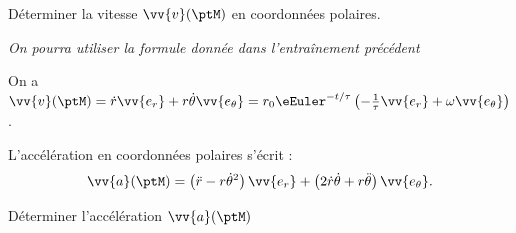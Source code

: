 \debutEntrainement






\begin{enonce}
	Déterminer la vitesse $\vv{v}(\ptM)$ en coordonnées polaires. \minusMedskip
	
	{\itshape On pourra utiliser la formule donnée dans l'entraînement précédent}
\end{enonce}


\begin{corrige}
	On a $ \vv{v}(\ptM)=\dot{r} \vv{e_r}+ r\dot{\theta}\vv{e_\theta}=r_0 \eEuler^{-t/\tau}\left(-\frac{1}{\tau}\vv{e_r}+\omega\vv{e_\theta} \right)$.
\end{corrige}	



\pauseEntrainement

L'accélération en coordonnées polaires s'écrit : 
\[
\vv{a}(\ptM)=\left(\ddot{r}-r\dot{\theta}^2\right) \vv{e_r}+\left(2\dot{r}\dot{\theta}+r\ddot{\theta}\right) \vv{e_\theta}.
\]
\vspace{-8mm}

\repriseEntrainement




\begin{enonce}
	Déterminer l'accélération $\vv{a}(\ptM)$
\end{enonce}


